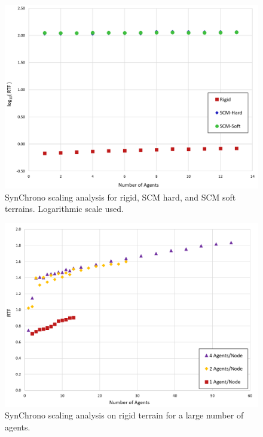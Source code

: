 \documentclass[12pt,twocolumn]{article}
\newcommand{\chrono}{Chrono}
\newcommand{\synchrono}{Syn\chrono{}}
\begin{document}
\begin{figure}
    \centering
    \includegraphics[width=\columnwidth]{Figs/syn_SCM_scaling.png}
    \caption{\synchrono{} scaling analysis for rigid, SCM hard, and SCM soft terrains. Logarithmic scale used.}   
    \label{fig:scmscaling}
\end{figure}

\begin{figure}
    \centering
    \includegraphics[width=\columnwidth]{Figs/syn_SCM_many.png}
    \caption{\synchrono{} scaling analysis on rigid terrain for a large number of agents.}   
    \label{fig:scmscalingrigid}
\end{figure}


\end{document}
